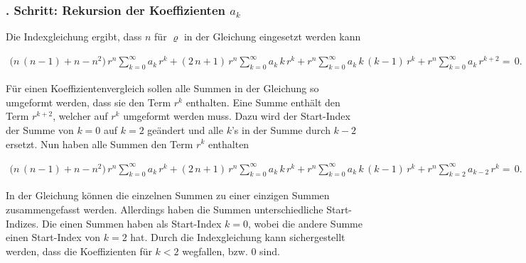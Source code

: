 \subsubsection{. Schritt: Rekursion der Koeffizienten $a_k$}
\begin{normalsize}%
Die Indexgleichung ergibt, dass $n$ f\"ur $\varrho$ in der Gleichung  eingesetzt werden kann
\end{normalsize}
\begin{align}
	\biggl(
	n \, \left( n - 1 \right)
	+
	n
	-
	n^2
	\biggr)
	\, r^{n}
	\sum_{k=0}^{\infty} a_k \, r^k
	+
	\left(	
	2 \, n
	+
	1
	\right)
	\, r^{n}
	\sum_{k=0}^{\infty} a_k \, k \, r^k
	+
	r^{n}
	\sum_{k=0}^{\infty} a_k \, k \, \left( k - 1 \right) \, r^k
	+
	r^{n}
	\sum_{k=0}^{\infty} a_k \, r^{k + 2}
	= \, 0
	\label{eq:bessel:potenzreihe:dgl:index:eingesetzt}
	\text{.}
\end{align}
\begin{normalsize}%
F\"ur einen Koeffizientenvergleich sollen alle Summen in der Gleichung  so umgeformt werden,
dass sie den Term $r^k$ enthalten.
Eine Summe enth\"alt den Term $r^{k + 2}$,
welcher auf $r^k$ umgeformt werden muss.
Dazu wird der Start-Index der Summe von $k = 0$ auf $k = 2$ ge\"andert und alle $k$'s in der Summe durch $k - 2$ ersetzt.
Nun haben alle Summen den Term $r^k$ enthalten
\end{normalsize}
\begin{align}
	\biggl(
	n \, \left( n - 1 \right)
	+
	n
	-
	n^2
	\biggr)
	\, r^{n}
	\sum_{k=0}^{\infty} a_k \, r^k
	+
	\left(	
	2 \, n
	+
	1
	\right)
	\, r^{n}
	\sum_{k=0}^{\infty} a_k \, k \, r^k
	+
	r^{n}
	\sum_{k=0}^{\infty} a_k \, k \, \left( k - 1 \right) \, r^k
	+
	r^{n}
	\sum_{k=2}^{\infty} a_{k - 2} \, r^k
	= \, 0
	\label{eq:bessel:potenzreihe:dgl:index:eingesetzt:gleichesummen}
	\text{.}
\end{align}
\begin{normalsize}%
In der Gleichung  k\"onnen die einzelnen Summen zu einer einzigen Summen zusammengefasst werden.
Allerdings haben die Summen unterschiedliche Start-Indizes.
Die einen Summen haben als Start-Index $k = 0$,
wobei die andere Summe einen Start-Index von $k = 2$ hat.
Durch die Indexgleichung kann sichergestellt werden,
dass die Koeffizienten f\"ur $k < 2$ wegfallen,
bzw. 0 sind.
\end{normalsize}
